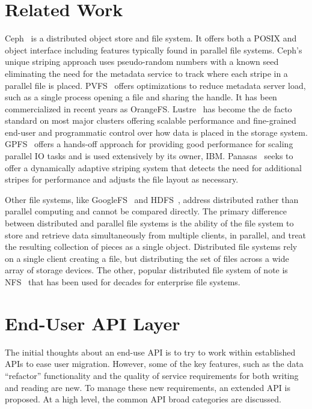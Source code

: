 \documentclass{sig-alt-gov2}
\begin{document}
\section{Related Work}
\label{sec:related}

Ceph~\cite{weil:ceph} is a distributed object store and file system. It offers
both a POSIX and object interface including features typically found in parallel
file systems.
Ceph's unique striping approach uses pseudo-random numbers with a
known seed eliminating the need for the metadata service to track where each
stripe in a parallel file is placed.
PVFS~\cite{carns:pvfs} offers optimizations to reduce metadata server load,
such as a single process opening a file and sharing the handle.
It has been
commercialized in recent years as OrangeFS.
Lustre~\cite{braam:lustre-arch} has become the de facto standard on most major
clusters offering scalable performance and fine-grained end-user and
programmatic control over how data is placed in the storage system.
GPFS~\cite{schmuck:gpfs} offers a hands-off approach for providing good
performance for scaling parallel IO tasks and is used extensively by its owner,
IBM.
Panasas~\cite{panasas:architecture} seeks to offer a dynamically adaptive
striping system that detects the need for additional stripes for performance
and adjusts the file layout as necessary.

Other file systems, like GoogleFS~\cite{ghemawat:googlefs} and
HDFS~\cite{Shvachko:2010:hdfs}, address distributed rather than parallel
computing and cannot be compared directly.
The primary difference between
distributed and parallel file systems is the ability of the file system to
store and retrieve data simultaneously from multiple clients, in parallel, and
treat the resulting collection of pieces as a single object.  Distributed file
systems rely on a single client creating a file, but distributing the set of
files across a wide array of storage devices.
The other, popular distributed
file system of note is NFS~\cite{powlowski:1994:nfs3} that has been used for
decades for enterprise file systems.

\section{End-User API Layer}
\label{sec:end-user}

The initial thoughts about an end-use API is to try to work within established
APIs to ease user migration. However, some of the key features, such as the
data ``refactor'' functionality and the quality of service requirements for
both writing and reading are new. To manage these new requirements, an extended
API is proposed. At a high level, the common API broad categories are
discussed.
\end{document}
